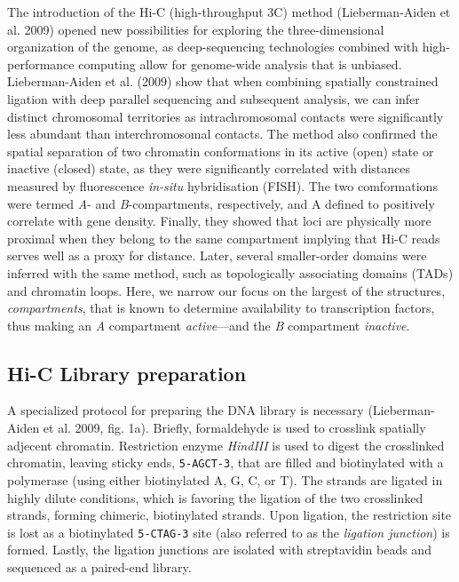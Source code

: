 \documentclass[
  11pt,
  a4paper,
]{scrbook}
\begin{document}
The introduction of the Hi-C (high-throughput 3C) method
(Lieberman-Aiden et al. 2009) opened new possibilities for exploring the
three-dimensional organization of the genome, as deep-sequencing
technologies combined with high-performance computing allow for
genome-wide analysis that is unbiased. Lieberman-Aiden et al. (2009)
show that when combining spatially constrained ligation with deep
parallel sequencing and subsequent analysis, we can infer distinct
chromosomal territories as intrachromosomal contacts were significantly
less abundant than interchromosomal contacts. The method also confirmed
the spatial separation of two chromatin conformations in its active
(open) state or inactive (closed) state, as they were significantly
correlated with distances measured by fluorescence \emph{in-situ}
hybridisation (FISH). The two comformations were termed \emph{A}- and
\emph{B}-compartments, respectively, and A defined to positively
correlate with gene density. Finally, they showed that loci are
physically more proximal when they belong to the same compartment
implying that Hi-C reads serves well as a proxy for distance. Later,
several smaller-order domains were inferred with the same method, such
as topologically associating domains (TADs) and chromatin loops. Here,
we narrow our focus on the largest of the structures,
\emph{compartments}, that is known to determine availability to
transcription factors, thus making an \emph{A} compartment
\emph{active}---and the \emph{B} compartment \emph{inactive}.

\subsection{Hi-C Library preparation}\label{hi-c-library-preparation}

A specialized protocol for preparing the DNA library is necessary
(Lieberman-Aiden et al. 2009, fig. 1a). Briefly, formaldehyde is used to
crosslink spatially adjecent chromatin. Restriction enzyme
\emph{HindIII} is used to digest the crosslinked chromatin, leaving
sticky ends, \texttt{5-AGCT-3}, that are filled and biotinylated with a
polymerase (using either biotinylated A, G, C, or T). The strands are
ligated in highly dilute conditions, which is favoring the ligation of
the two crosslinked strands, forming chimeric, biotinylated strands.
Upon ligation, the restriction site is lost as a biotinylated
\texttt{5-CTAG-3} site (also referred to as the \emph{ligation
junction}) is formed. Lastly, the ligation junctions are isolated with
streptavidin beads and sequenced as a paired-end library.
\end{document}
